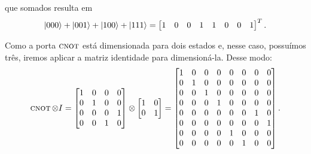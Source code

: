 que somados resulta em
\begin{equation}\label{eq:3estados}
\ket{000}+\ket{001}+\ket{100}+\ket{111}= \begin{bmatrix}
1 & 0 & 0 & 1 & 1 & 0 & 0 & 1
\end{bmatrix}^T.
\end{equation}

Como a porta \(\operatorname{\textsc{cnot}}\) está dimensionada para dois estados e, nesse caso, possuímos três, iremos aplicar a matriz identidade para dimensioná-la. Desse modo:
\begin{equation}\label{eq:cnotI}
\operatorname{\textsc{cnot}} \otimes I = \begin{bmatrix}
		1 & 0 & 0 & 0 \\
		0 & 1 & 0 & 0 \\
		0 & 0 & 0 & 1 \\
		0 & 0 & 1 & 0
		\end{bmatrix} \otimes \begin{bmatrix}
		1 & 0 \\
		0 & 1
		\end{bmatrix} = \begin{bmatrix}
		1 & 0 & 0 & 0 & 0 & 0 & 0 & 0 \\
		0 & 1 & 0 & 0 & 0 & 0 & 0 & 0 \\
		0 & 0 & 1 & 0 & 0 & 0 & 0 & 0 \\
		0 & 0 & 0 & 1 & 0 & 0 & 0 & 0 \\
		0 & 0 & 0 & 0 & 0 & 0 & 1 & 0 \\
		0 & 0 & 0 & 0 & 0 & 0 & 0 & 1 \\
		0 & 0 & 0 & 0 & 1 & 0 & 0 & 0 \\
		0 & 0 & 0 & 0 & 0 & 1 & 0 & 0 		
		\end{bmatrix}.
\end{equation}

